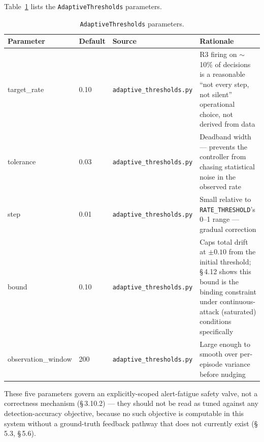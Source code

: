 Table~\ref{tab:adaptive_thresholds_params} lists the
\texttt{AdaptiveThresholds} parameters.

\begin{table}[ht]
  \centering
  \caption{\texttt{AdaptiveThresholds} parameters.}
  \label{tab:adaptive_thresholds_params}
  \begin{tabular}{p{2.8cm}p{3.6cm}p{2.3cm}p{6.0cm}}
    \toprule
    Parameter & Default & Source & Rationale \\
    \midrule
    target\_rate & 0.10 & \texttt{adaptive\_thresholds.py} & R3 firing on $\sim$10\% of decisions is a reasonable ``not every step, not silent'' operational choice, not derived from data \\
    tolerance & 0.03 & \texttt{adaptive\_thresholds.py} & Deadband width --- prevents the controller from chasing statistical noise in the observed rate \\
    step & 0.01 & \texttt{adaptive\_thresholds.py} & Small relative to \texttt{RATE\_THRESHOLD}'s 0--1 range --- gradual correction \\
    bound & 0.10 & \texttt{adaptive\_thresholds.py} & Caps total drift at $\pm 0.10$ from the initial threshold; \S\,4.12 shows this bound is the binding constraint under continuous-attack (saturated) conditions specifically \\
    observation\_window & 200 & \texttt{adaptive\_thresholds.py} & Large enough to smooth over per-episode variance before nudging \\
    \bottomrule
  \end{tabular}
\end{table}

These five parameters govern an explicitly-scoped alert-fatigue safety
valve, not a correctness mechanism (\S\,3.10.2) --- they should not be read
as tuned against any detection-accuracy objective, because no such objective
is computable in this system without a ground-truth feedback pathway that
does not currently exist (\S\,5.3, \S\,5.6).
